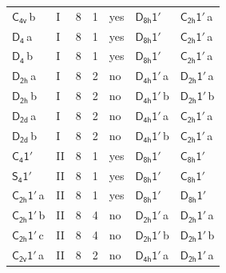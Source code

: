 \documentclass[10pt,a4paper]{article}
\numberwithin{equation}{section}
\newcommand{\grp}[1]{\mathsf{#1}}
\newcommand{\clsletter}[1]{\,{\scriptsize\color{black!55}#1}}
\begin{document}
{\begin{longtable}{@{}llrrlll@{}}
\href{../../../rotation/data/pdf/C4v.pdf}{$\grp{C_{4v}}$}\clsletter{b} & I & 8 & 1 & yes & \href{D8h-1p.pdf}{$\grp{D_{8h}1'}$} & \href{C2h-1p.pdf}{$\grp{C_{2h}1'}$}\clsletter{a}\\
\href{../../../rotation/data/pdf/D4.pdf}{$\grp{D_{4}}$}\clsletter{a} & I & 8 & 1 & yes & \href{D8h-1p.pdf}{$\grp{D_{8h}1'}$} & \href{C2h-1p.pdf}{$\grp{C_{2h}1'}$}\clsletter{a}\\
\href{../../../rotation/data/pdf/D4.pdf}{$\grp{D_{4}}$}\clsletter{b} & I & 8 & 1 & yes & \href{D8h-1p.pdf}{$\grp{D_{8h}1'}$} & \href{C2h-1p.pdf}{$\grp{C_{2h}1'}$}\clsletter{a}\\
\href{../../../rotation/data/pdf/D2h.pdf}{$\grp{D_{2h}}$}\clsletter{a} & I & 8 & 2 & no & \href{D4h-1p.pdf}{$\grp{D_{4h}1'}$}\clsletter{a} & \href{D2h-1p.pdf}{$\grp{D_{2h}1'}$}\clsletter{a}\\
\href{../../../rotation/data/pdf/D2h.pdf}{$\grp{D_{2h}}$}\clsletter{b} & I & 8 & 2 & no & \href{D4h-1p.pdf}{$\grp{D_{4h}1'}$}\clsletter{b} & \href{D2h-1p.pdf}{$\grp{D_{2h}1'}$}\clsletter{b}\\
\href{../../../rotation/data/pdf/D2d.pdf}{$\grp{D_{2d}}$}\clsletter{a} & I & 8 & 2 & no & \href{D4h-1p.pdf}{$\grp{D_{4h}1'}$}\clsletter{a} & \href{C2h-1p.pdf}{$\grp{C_{2h}1'}$}\clsletter{a}\\
\href{../../../rotation/data/pdf/D2d.pdf}{$\grp{D_{2d}}$}\clsletter{b} & I & 8 & 2 & no & \href{D4h-1p.pdf}{$\grp{D_{4h}1'}$}\clsletter{b} & \href{C2h-1p.pdf}{$\grp{C_{2h}1'}$}\clsletter{a}\\
\href{C4-1p.pdf}{$\grp{C_{4}1'}$} & II & 8 & 1 & yes & \href{D8h-1p.pdf}{$\grp{D_{8h}1'}$} & \href{C8h-1p.pdf}{$\grp{C_{8h}1'}$}\\
\href{S4-1p.pdf}{$\grp{S_{4}1'}$} & II & 8 & 1 & yes & \href{D8h-1p.pdf}{$\grp{D_{8h}1'}$} & \href{C8h-1p.pdf}{$\grp{C_{8h}1'}$}\\
\href{C2h-1p.pdf}{$\grp{C_{2h}1'}$}\clsletter{a} & II & 8 & 1 & yes & \href{D8h-1p.pdf}{$\grp{D_{8h}1'}$} & \href{D8h-1p.pdf}{$\grp{D_{8h}1'}$}\\
\href{C2h-1p.pdf}{$\grp{C_{2h}1'}$}\clsletter{b} & II & 8 & 4 & no & \href{D2h-1p.pdf}{$\grp{D_{2h}1'}$}\clsletter{a} & \href{D2h-1p.pdf}{$\grp{D_{2h}1'}$}\clsletter{a}\\
\href{C2h-1p.pdf}{$\grp{C_{2h}1'}$}\clsletter{c} & II & 8 & 4 & no & \href{D2h-1p.pdf}{$\grp{D_{2h}1'}$}\clsletter{b} & \href{D2h-1p.pdf}{$\grp{D_{2h}1'}$}\clsletter{b}\\
\href{C2v-1p.pdf}{$\grp{C_{2v}1'}$}\clsletter{a} & II & 8 & 2 & no & \href{D4h-1p.pdf}{$\grp{D_{4h}1'}$}\clsletter{a} & \href{D2h-1p.pdf}{$\grp{D_{2h}1'}$}\clsletter{a}\\

\end{longtable}}
\end{document}
